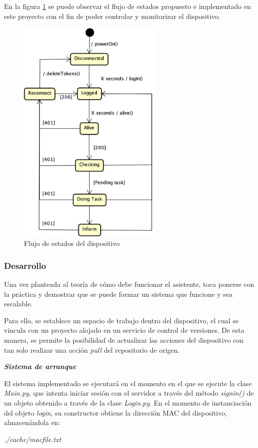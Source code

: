 En la figura \ref{fig:prototype-flow} se puede observar el flujo de estados propuesto e implementado en este proyecto con el fin de poder controlar y monitorizar el dispositivo.

\begin{figure}[h!]
    \centering
    \includegraphics[width=7cm]{./img/state/prototype-flow.png}
    \caption{Flujo de estados del dispositivo}
    \label{fig:prototype-flow}
\end{figure}

\subsubsection{Desarrollo}
Una vez planteada al teoría de cómo debe funcionar el asistente, toca ponerse con la práctica y demostrar que se puede formar un sistema que funcione y sea escalable.

Para ello, se establece un espacio de trabajo dentro del dispositivo, el cual se vincula con un proyecto alojado en un servicio de control de versiones.
De esta manera, se permite la posibilidad de actualizar las acciones del dispositivo con tan solo realizar una acción \textit{pull} del repositorio de origen.

\textit{\textbf{Sistema de arranque}}

El sistema implementado se ejecutará en el momento en el que se ejecute la clase \textit{Main.py}, que intenta iniciar sesión con el servidor a través del método \textit{signin()} de un objeto obtenido a través de la clase \textit{Login.py}.
En el momento de instanciación del objeto \textit{login}, su constructor obtiene la dirección MAC del dispositivo, almacenándola en: 
\begin{center}
\textit{./cache/macfile.txt}
\end{center}

